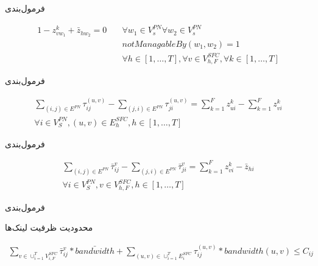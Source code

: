 \documentclass{beamer}
\begin{document}
\begin{persian}
\begin{frame}{فرمول‌بندی}
    \begin{latin}
        \begin{align}
            1 - z_{vw_1}^k + \bar{z}_{hw_2} = 0
            \quad
            & \forall w_1 \in V_s^{PN} \forall w_2 \in V_s^{PN} \nonumber \\
            & notManagableBy(w_1, w_2) = 1 \nonumber \\
            & \forall h \in [1,\dots,T],
            \forall v \in V_{h,F}^{SFC},
            \forall k \in [1,\dots,T]
        \end{align}
    \end{latin}
\end{frame}
\begin{frame}{فرمول‌بندی}
    \par
    \begin{latin}\begin{align}
        \sum_{(i,j) \in E^{PN}} \tau_{ij}^{(u,v)} - \sum_{(j,i) \in E^{PN}} \tau_{ji}^{(u,v)} = \sum_{k=1}^{F} z_{ui}^{k} - \sum_{k=1}^{F} z_{vi}^{k} \nonumber \\
        \forall i \in V_{S}^{PN}, (u,v) \in E_{h}^{SFC}, h \in [1,\ldots, T]
    \end{align}\end{latin}
\end{frame}
\begin{frame}{فرمول‌بندی}
    \par
    \begin{latin}\begin{align}
        \sum_{(i,j) \in E^{PN}} \bar{\tau}_{ij}^{v} - \sum_{(j,i) \in E^{PN}} \bar{\tau}_{ji}^{v} = \sum_{k=1}^{F} z_{vi}^{k} - \bar{z}_{hi} \nonumber \\
        \forall i \in V_{S}^{PN}, v \in V_{h, F}^{SFC}, h \in [1,\ldots, T]
    \end{align}\end{latin}
\end{frame}
\begin{frame}{فرمول‌بندی}
    \par
    محدودیت ظرفیت لینک‌ها
    \begin{latin}\begin{align}
        \sum_{v \in \cup_{i=1}^{T} V_{i,F}^{SFC}} \bar{\tau}_{ij}^{v} * \bar{bandwidth} + \sum_{(u,v) \in \cup_{i=1}^{T} E_{i}^{SFC}} \tau_{ij}^{(u,v)} * bandwidth(u,v) \le C_{ij} \nonumber \\

\end{align}
\end{latin}
\end{frame}
\end{persian}
\end{document}
